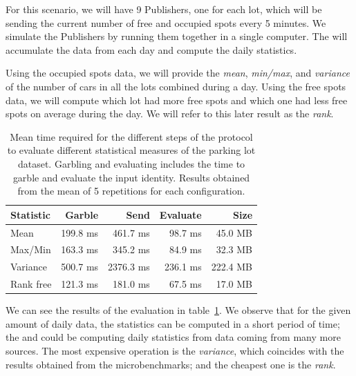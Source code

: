 For this scenario, we will have 9 Publishers, one for each lot, which will be
sending the current number of free and occupied spots every 5 minutes.  We
simulate the Publishers by running them together in a single computer.  The
\broker will accumulate the data from each day and compute the daily statistics.

Using the occupied spots data, we will provide the \emph{mean}, \emph{min/max},
and \emph{variance} of the number of cars in all the lots combined during a
day.  Using the free spots data, we will compute which lot had more free spots
and which one had less free spots on average during the day.  We will refer to
this later result as the \emph{rank}.

\begin{table}
    \begin{tabular}{l*{3}{r}r}
    \textbf{Statistic}  & \textbf{Garble} & \textbf{Send} & \textbf{Evaluate} & \textbf{Size} \\
    \hline
    Mean       & 199.8 ms & 461.7 ms & 98.7  ms & 45.0 MB \\
    Max/Min    & 163.3 ms & 345.2 ms & 84.9  ms & 32.3 MB \\
    Variance   & 500.7 ms & 2376.3 ms & 236.1 ms & 222.4 MB \\
    \hline
    Rank free  & 121.3 ms & 181.0 ms & 67.5 ms & 17.0 MB \\
    \end{tabular}
    \caption{Mean time required for the different steps of the protocol to
      evaluate different statistical measures of the parking lot dataset.
      Garbling and evaluating includes the time to garble and evaluate the
      input identity.  Results obtained from the mean of 5 repetitions for each
      configuration.}
    \label{stats-times}
\end{table}

We can see the results of the evaluation in table~\ref{stats-times}.  We
observe that for the given amount of daily data, the statistics can be computed
in a short period of time; the \broker and \garbler could be computing daily
statistics from data coming from many more sources.  The most expensive
operation is the \emph{variance}, which coincides with the results obtained
from the microbenchmarks; and the cheapest one is the \emph{rank}.


